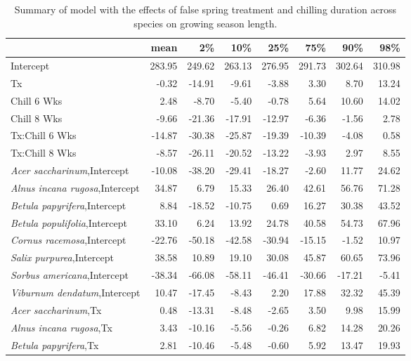 \documentclass{article}\usepackage[]{graphicx}\usepackage[]{color}
\begin{document}
\newpage
\begin{longtable}{lrrrrrrr}
\caption{Summary of model with the effects of false spring treatment and chilling duration across species on growing season length.} \\ 
  \hline
 & mean & 2\% & 10\% & 25\% & 75\% & 90\% & 98\% \\ 
  \hline \endhead  \hline
Intercept & 283.95 & 249.62 & 263.13 & 276.95 & 291.73 & 302.64 & 310.98 \\ 
  Tx & -0.32 & -14.91 & -9.61 & -3.88 & 3.30 & 8.70 & 13.24 \\ 
  Chill 6 Wks & 2.48 & -8.70 & -5.40 & -0.78 & 5.64 & 10.60 & 14.02 \\ 
  Chill 8 Wks & -9.66 & -21.36 & -17.91 & -12.97 & -6.36 & -1.56 & 2.78 \\ 
  Tx:Chill 6 Wks & -14.87 & -30.38 & -25.87 & -19.39 & -10.39 & -4.08 & 0.58 \\ 
  Tx:Chill 8 Wks & -8.57 & -26.11 & -20.52 & -13.22 & -3.93 & 2.97 & 8.55 \\ 
  \textit{Acer saccharinum},Intercept & -10.08 & -38.20 & -29.41 & -18.27 & -2.60 & 11.77 & 24.62 \\ 
  \textit{Alnus incana rugosa},Intercept & 34.87 & 6.79 & 15.33 & 26.40 & 42.61 & 56.76 & 71.28 \\ 
  \textit{Betula papyrifera},Intercept & 8.84 & -18.52 & -10.75 & 0.69 & 16.27 & 30.38 & 43.52 \\ 
  \textit{Betula populifolia},Intercept & 33.10 & 6.24 & 13.92 & 24.78 & 40.58 & 54.73 & 67.96 \\ 
  \textit{Cornus racemosa},Intercept & -22.76 & -50.18 & -42.58 & -30.94 & -15.15 & -1.52 & 10.97 \\ 
  \textit{Salix purpurea},Intercept & 38.58 & 10.89 & 19.10 & 30.08 & 45.87 & 60.65 & 73.96 \\ 
  \textit{Sorbus americana},Intercept & -38.34 & -66.08 & -58.11 & -46.41 & -30.66 & -17.21 & -5.41 \\ 
  \textit{Viburnum dendatum},Intercept & 10.47 & -17.45 & -8.43 & 2.20 & 17.88 & 32.32 & 45.39 \\ 
  \textit{Acer saccharinum},Tx & 0.48 & -13.31 & -8.48 & -2.65 & 3.50 & 9.98 & 15.99 \\ 
  \textit{Alnus incana rugosa},Tx & 3.43 & -10.16 & -5.56 & -0.26 & 6.82 & 14.28 & 20.26 \\ 
  \textit{Betula papyrifera},Tx & 2.81 & -10.46 & -5.48 & -0.60 & 5.92 & 13.47 & 19.93 \\ 

\end{longtable}
\end{document}
